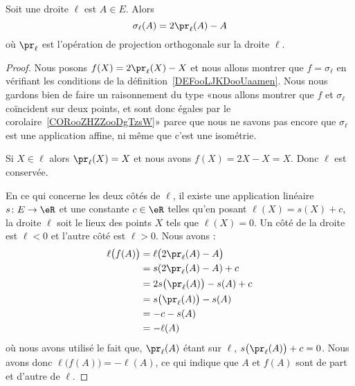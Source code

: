 \begin{lemma}       \label{LEMooZSDRooUkNYer}
	Soit une droite \( \ell\) est \( A\in E\). Alors
	\begin{equation}        \label{EQooVUQDooKuwszl}
		\sigma_{\ell}(A)=2\pr_{\ell}(A)-A
	\end{equation}
	où \( \pr_{\ell}\) est l'opération de projection orthogonale sur la droite \( \ell\).
\end{lemma}

\begin{proof}
	Nous posons \( f(X)=2\pr_{\ell}(X)-X\) et nous allons montrer que \( f=\sigma_{\ell}\) en vérifiant les conditions de la définition~\ref{DEFooLJKDooUaamen}.
	Nous nous gardons bien de faire un raisonnement du type «nous allons montrer que \( f\) et \( \sigma_{\ell}\) coïncident sur deux points, et sont donc égales par le corolaire~\ref{CORooZHZZooDgTzsW}» parce que nous ne savons pas encore que \( \sigma_{\ell}\) est une application affine, ni même que c'est une isométrie.

	Si \( X\in\ell\) alors \( \pr_{\ell}(X)=X\) et nous avons \( f(X)=2X-X=X\). Donc \( \ell\) est conservée.

	En ce qui concerne les deux côtés de \( \ell\), il existe une application linéaire \( s\colon E\to \eR\) et une constante \( c\in \eR\) telles qu'en posant \( \ell(X)=s(X)+c\), la droite \( \ell\) soit le lieux des points \( X\) tels que \( \ell(X)=0\). Un côté de la droite est \( \ell<0\) et l'autre côté est \( \ell>0\). Nous avons :
	\begin{subequations}
		\begin{align}
			\ell\big( f(A) \big) & =\ell\big( 2\pr_{\ell}(A)-A \big)   \\
			                     & =s(2\pr_{\ell}(A)-A)+c              \\
			                     & =2s\big( \pr_{\ell}(A) \big)-s(A)+c \\
			                     & =s\big( \pr_{\ell}(A) \big)-s(A)    \\
			                     & =-c-s(A)                            \\
			                     & =-\ell(A)
		\end{align}
	\end{subequations}
	où nous avons utilisé le fait que, \( \pr_{\ell}(A)\) étant sur \( \ell\), \( s\big( \pr_{\ell}(A) \big)+c=0\). Nous avons donc \( \ell\big( f(A) \big)=-\ell(A)\), ce qui indique que \( A\) et \( f(A)\) sont de part et d'autre de \( \ell\).


\end{proof}

